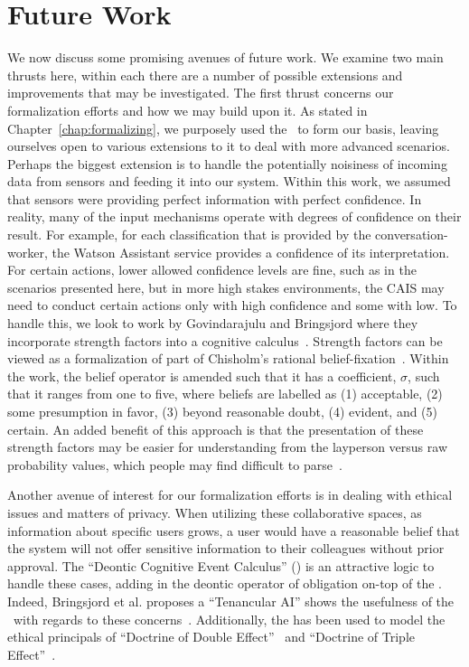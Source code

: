 \section{Future Work}

We now discuss some promising avenues of future work. We examine two main
thrusts here, within each there are a number of possible extensions and
improvements that may be investigated. The first thrust concerns our
formalization efforts and how we may build upon it. As stated in
Chapter~\ref{chap:formalizing}, we purposely used the \CEC\ to form our
basis, leaving ourselves open to various extensions to it to deal with
more advanced scenarios. Perhaps the biggest extension is to handle the
potentially noisiness of incoming data from sensors and feeding it into
our system. Within this work, we assumed that sensors were providing
perfect information with perfect confidence. In reality, many of the input
mechanisms operate with degrees of confidence on their result. For example,
for each classification that is provided by the conversation-worker, the
Watson Assistant service provides a confidence of its interpretation. For
certain actions, lower allowed confidence levels are fine, such as in the
scenarios presented here, but in more high stakes environments,
the CAIS may need to conduct certain actions only with high confidence and
some with low. To handle this, we look to work by Govindarajulu and
Bringsjord where they incorporate strength factors into a cognitive
calculus~\cite{govindarajulu_strength_2017}. Strength factors can be viewed
as a formalization of part of Chisholm’s rational
belief-fixation~\cite{theory.of.knowledge3.chisholm}. Within the work,
the belief operator is amended such that it has a coefficient, $\sigma$,
such that it ranges from one to five, where beliefs are labelled as (1)
acceptable, (2) some presumption in favor, (3) beyond reasonable doubt,
(4) evident, and (5) certain. An added benefit of this approach is that
the presentation of these strength factors may be easier for understanding
from the layperson versus raw probability values, which people may find
difficult to parse~\cite{kaye_can_1991}.

Another avenue of interest for our formalization efforts is in dealing with 
ethical issues and matters of privacy. When utilizing these collaborative spaces,
as information about specific users grows, a user would have a reasonable
belief that the system will not offer sensitive information to their
colleagues without prior approval. The ``Deontic Cognitive Event
Calculus'' (\DCEC) is an attractive logic to handle these cases, adding in the
deontic operator of obligation on-top of the \CEC. Indeed, Bringsjord et al.
proposes a ``Tenancular AI'' shows the usefulness of the \DCEC\ with regards
to these concerns~\cite{bringsjord_tentacular_2018}. Additionally, the \DCEC
has been used to model the ethical principals of ``Doctrine of Double
Effect''~\cite{govindarajulu_automating_2017} and ``Doctrine of Triple
Effect''~\cite{peveler_towards_2018}.

